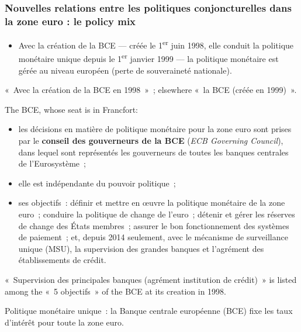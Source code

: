 \subsubsection{Nouvelles relations entre les politiques conjoncturelles dans la zone euro : le policy mix}

\begin{itemize}
  \item Avec la création de la BCE --- créée le 1\textsuperscript{er} juin 1998, elle
    conduit la politique monétaire unique depuis le 1\textsuperscript{er} janvier 1999
    --- la politique monétaire est gérée au niveau européen (perte de souveraineté
    nationale).
\end{itemize}

\begin{remark}
  «~Avec la création de la BCE en 1998~»~; elsewhere «~la BCE (créée en 1999)~».
\end{remark}

The BCE, whose seat is in Francfort:
\begin{itemize}
  \item les décisions en matière de politique monétaire pour la zone euro sont prises
    par le \textbf{conseil des gouverneurs de la BCE} (\textit{ECB Governing Council}),
    dans lequel sont représentés les gouverneurs de toutes les banques centrales de
    l'Eurosystème~;
  \item elle est indépendante du pouvoir politique~;
  \item ses objectifs~: définir et mettre en œuvre la politique monétaire de la zone
    euro~; conduire la politique de change de l'euro~; détenir et gérer les réserves de
    change des États membres~; assurer le bon fonctionnement des systèmes de paiement~;
    et, depuis 2014 seulement, avec le mécanisme de surveillance unique (MSU), la
    supervision des grandes banques et l'agrément des établissements de crédit.
\end{itemize}

\begin{remark}
  «~Supervision des principales banques (agrément institution de crédit)~» is listed
  among the «~5 objectifs~» of the BCE at its creation in 1998.
\end{remark}

\begin{definition}
  Politique monétaire unique~: la Banque centrale européenne (BCE) fixe les taux
  d'intérêt pour toute la zone euro.
\end{definition}

